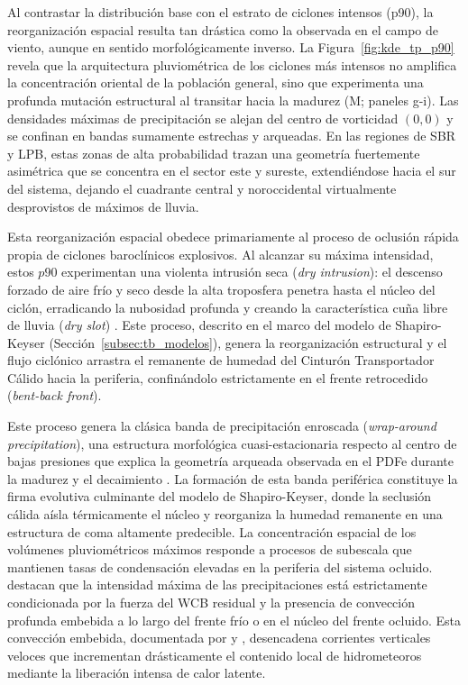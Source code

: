 Al contrastar la distribución base con el estrato de ciclones intensos (p90), la reorganización espacial resulta tan drástica como la observada en el campo de viento, aunque en sentido morfológicamente inverso. 
La Figura~\ref{fig:kde_tp_p90} revela que la arquitectura pluviométrica de los ciclones más intensos no amplifica la concentración oriental de la población general, sino que experimenta una profunda mutación estructural al transitar hacia la madurez (M; paneles g-i). 
Las densidades máximas de precipitación se alejan del centro de vorticidad $(0,0)$ y se confinan en bandas sumamente estrechas y arqueadas. 
En las regiones de SBR y LPB, estas zonas de alta probabilidad trazan una geometría fuertemente asimétrica que se concentra en el sector este y sureste, extendiéndose hacia el sur del sistema, dejando el cuadrante central y noroccidental virtualmente desprovistos de máximos de lluvia.

Esta reorganización espacial obedece primariamente al proceso de oclusión rápida propia de ciclones baroclínicos explosivos. 
Al alcanzar su máxima intensidad, estos $p90$ experimentan una violenta intrusión seca (\textit{dry intrusion}): el descenso forzado de aire frío y seco desde la alta troposfera penetra hasta el núcleo del ciclón, erradicando la nubosidad profunda y creando la característica cuña libre de lluvia (\textit{dry slot}) \citep{shapiro1999bridge}. Este proceso, descrito en el marco del modelo de Shapiro-Keyser (Sección~\ref{subsec:tb_modelos}), genera la reorganización estructural y el flujo ciclónico arrastra el remanente de humedad del Cinturón Transportador Cálido hacia la periferia, confinándolo estrictamente en el frente retrocedido (\textit{bent-back front}). 

Este proceso genera la clásica banda de precipitación enroscada (\textit{wrap-around precipitation}), una estructura morfológica cuasi-estacionaria respecto al centro de bajas presiones que explica la geometría arqueada observada en el PDFe durante la madurez y el decaimiento \citep{schultz2021antecedents}. 
La formación de esta banda periférica constituye la firma evolutiva culminante del modelo de Shapiro-Keyser, donde la seclusión cálida aísla térmicamente el núcleo y reorganiza la humedad remanente en una estructura de coma altamente predecible.
La concentración espacial de los volúmenes pluviométricos máximos responde a procesos de subescala que mantienen tasas de condensación elevadas en la periferia del sistema ocluido. \citet{priestley2022improved} destacan que la intensidad máxima de las precipitaciones está estrictamente condicionada por la fuerza del WCB residual y la presencia de convección profunda embebida a lo largo del frente frío o en el núcleo del frente ocluido. 
Esta convección embebida, documentada por \citet{oertel2021warm} y \citet{blanchard2021warm}, desencadena corrientes verticales veloces que incrementan drásticamente el contenido local de hidrometeoros mediante la liberación intensa de calor latente. 

